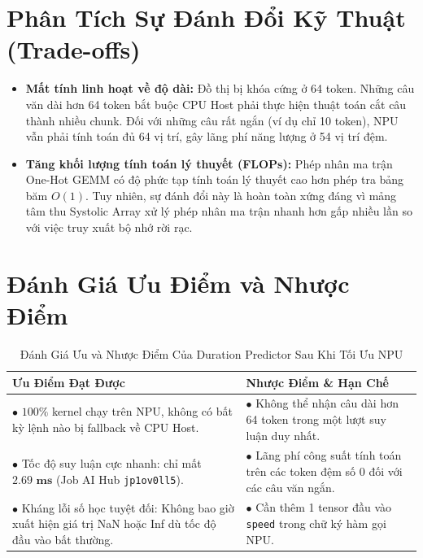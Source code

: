 \documentclass[11pt,a4paper,oneside,table]{report}
\begin{document}
\section{Phân Tích Sự Đánh Đổi Kỹ Thuật (Trade-offs)}
\begin{itemize}
    \item \textbf{Mất tính linh hoạt về độ dài:} Đồ thị bị khóa cứng ở 64 token. Những câu văn dài hơn 64 token bắt buộc CPU Host phải thực hiện thuật toán cắt câu thành nhiều chunk. Đối với những câu rất ngắn (ví dụ chỉ 10 token), NPU vẫn phải tính toán đủ 64 vị trí, gây lãng phí năng lượng ở 54 vị trí đệm.
    \item \textbf{Tăng khối lượng tính toán lý thuyết (FLOPs):} Phép nhân ma trận One-Hot GEMM có độ phức tạp tính toán lý thuyết cao hơn phép tra bảng băm $O(1)$. Tuy nhiên, sự đánh đổi này là hoàn toàn xứng đáng vì mảng tâm thu Systolic Array xử lý phép nhân ma trận nhanh hơn gấp nhiều lần so với việc truy xuất bộ nhớ rời rạc.
\end{itemize}

\section{Đánh Giá Ưu Điểm và Nhược Điểm}
\begin{table}[H]
\centering
\small
\sffamily
\caption{Đánh Giá Ưu và Nhược Điểm Của Duration Predictor Sau Khi Tối Ưu NPU}
\label{tab:dp_pros_cons}
\vspace{2mm}
\begin{tabularx}{\textwidth}{p{7.5cm} p{7.5cm}}
\toprule
\textbf{Ưu Điểm Đạt Được} & \textbf{Nhược Điểm \& Hạn Chế} \\
\midrule
$\bullet$ $100\%$ kernel chạy trên NPU, không có bất kỳ lệnh nào bị fallback về CPU Host. & $\bullet$ Không thể nhận câu dài hơn 64 token trong một lượt suy luận duy nhất. \\
\addlinespace
$\bullet$ Tốc độ suy luận cực nhanh: chỉ mất $\mathbf{2.69\text{ ms}}$ (Job AI Hub \texttt{jp1ov0ll5}). & $\bullet$ Lãng phí công suất tính toán trên các token đệm số 0 đối với các câu văn ngắn. \\
\addlinespace
$\bullet$ Kháng lỗi số học tuyệt đối: Không bao giờ xuất hiện giá trị NaN hoặc Inf dù tốc độ đầu vào bất thường. & $\bullet$ Cần thêm 1 tensor đầu vào \texttt{speed} trong chữ ký hàm gọi NPU. \\
\bottomrule
\end{tabularx}
\end{table}
\end{document}
